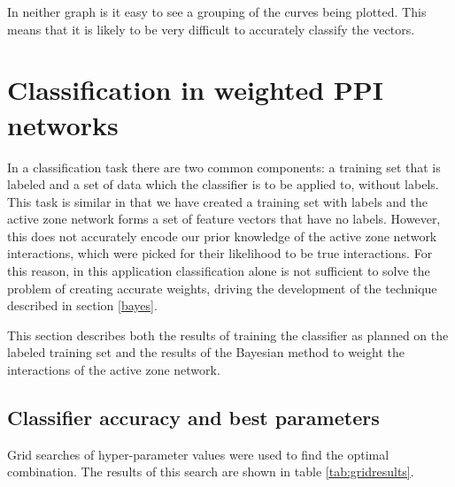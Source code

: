In neither graph is it easy to see a grouping of the curves being plotted.
This means that it is likely to be very difficult to accurately classify the vectors.

\section{Classification in weighted PPI networks}

In a classification task there are two common components: a training set that is labeled and a set of data which the classifier is to be applied to, without labels.
This task is similar in that we have created a training set with labels and the active zone network forms a set of feature vectors that have no labels.
However, this does not accurately encode our prior knowledge of the active zone network interactions, which were picked for their likelihood to be true interactions.
For this reason, in this application classification alone is not sufficient to solve the problem of creating accurate weights, driving the development of the technique described in section \ref{bayes}.

This section describes both the results of training the classifier as planned on the labeled training set and the results of the Bayesian method to weight the interactions of the active zone network.

\subsection{Classifier accuracy and best parameters}
\label{gridresults}

Grid searches of hyper-parameter values were used to find the optimal combination.
The results of this search are shown in table \ref{tab:gridresults}.

